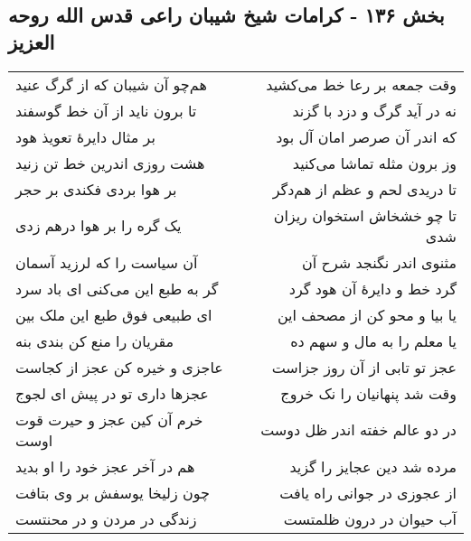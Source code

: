 \begin{center}
\section*{بخش ۱۳۶ - کرامات شیخ شیبان راعی قدس الله روحه العزیز}
\label{sec:sh136}
\begin{longtable}{l p{0.5cm} r}
هم‌چو آن شیبان که از گرگ عنید
&&
وقت جمعه بر رعا خط می‌کشید
\\
تا برون ناید از آن خط گوسفند
&&
نه در آید گرگ و دزد با گزند
\\
بر مثال دایرهٔ تعویذ هود
&&
که اندر آن صرصر امان آل بود
\\
هشت روزی اندرین خط تن زنید
&&
وز برون مثله تماشا می‌کنید
\\
بر هوا بردی فکندی بر حجر
&&
تا دریدی لحم و عظم از هم‌دگر
\\
یک گره را بر هوا درهم زدی
&&
تا چو خشخاش استخوان ریزان شدی
\\
آن سیاست را که لرزید آسمان
&&
مثنوی اندر نگنجد شرح آن
\\
گر به طبع این می‌کنی ای باد سرد
&&
گرد خط و دایرهٔ آن هود گرد
\\
ای طبیعی فوق طبع این ملک بین
&&
یا بیا و محو کن از مصحف این
\\
مقریان را منع کن بندی بنه
&&
یا معلم را به مال و سهم ده
\\
عاجزی و خیره کن عجز از کجاست
&&
عجز تو تابی از آن روز جزاست
\\
عجزها داری تو در پیش ای لجوج
&&
وقت شد پنهانیان را نک خروج
\\
خرم آن کین عجز و حیرت قوت اوست
&&
در دو عالم خفته اندر ظل دوست
\\
هم در آخر عجز خود را او بدید
&&
مرده شد دین عجایز را گزید
\\
چون زلیخا یوسفش بر وی بتافت
&&
از عجوزی در جوانی راه یافت
\\
زندگی در مردن و در محنتست
&&
آب حیوان در درون ظلمتست
\\
\end{longtable}
\end{center}
